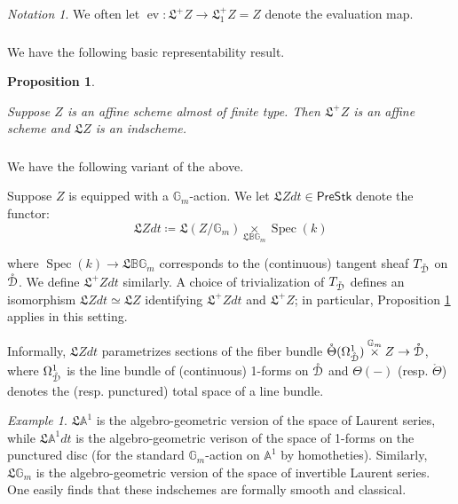\documentclass[reqno,11pt]{amsart}
\numberwithin{equation}{subsection}
\newtheorem{prop}[thm]{Proposition}
\theoremstyle{remark}
\newtheorem{example}[thm]{Example}
\newtheorem{notation}[thm]{Notation}
\newcommand{\bA}{{\mathbb A}}
\newcommand{\bB}{{\mathbb B}}
\newcommand{\bG}{{\mathbb G}}
\newcommand{\sD}{{\EuScript D}}
\newcommand{\fL}{{\mathfrak L}}
\newcommand{\on}{\operatorname}
\newcommand{\Spec}{\on{Spec}}
\newcommand{\ev}{\on{ev}}
\newcommand{\PreStk}{\mathsf{PreStk}}
\renewcommand{\o}[1]{\mathring{#1}}
\begin{document}
\begin{notation}

We often let $\ev:\fL^+ Z \to \fL_1^+ Z = Z$ 
denote the evaluation map.

\end{notation}

\subsubsection{}

We have the following basic representability result.

\begin{prop}\label{p:loop-rep}

Suppose $Z$ is an affine scheme almost of finite type.
Then $\fL^+ Z$ is an affine scheme and $\fL Z$ is an 
indscheme.

\end{prop}

\subsubsection{}

We have the following variant of the above.

Suppose $Z$ is equipped with a $\bG_m$-action. 
We let $\fL Zdt \in \PreStk$ denote the functor:
%
\[
\fL Z dt \coloneqq \fL(Z/\bG_m) \underset{\fL \bB \bG_m}{\times} \Spec(k)
\]

\noindent where $\Spec(k) \to \fL \bB \bG_m$ corresponds to the
(continuous) tangent sheaf $T_{\o{\sD}}$ on $\o{\sD}$.
We define $\fL^+Z dt$ similarly. A choice of trivialization
of $T_{\o{\sD}}$ defines an isomorphism $\fL Z dt \simeq \fL Z$
identifying $\fL^+ Z dt$ and $\fL^+ Z$; in particular,
Proposition \ref{p:loop-rep} applies in this setting.

Informally, $\fL Z dt$ parametrizes sections of
the fiber bundle $\o{\Theta}(\Omega_{\o{\sD}}^1) \overset{\bG_m}{\times} Z \to 
\o{\sD}$, where $\Omega_{\o{\sD}}^1$ is the line bundle 
of (continuous) 1-forms on $\o{\sD}$ and $\Theta(-)$ 
(resp. $\o{\Theta}$) denotes the
(resp. punctured) total space of a line bundle. 

\begin{example}

$\fL \bA^1$ is the algebro-geometric version of the space of Laurent
series, while $\fL \bA^1 dt$ is the algebro-geometric verison of the
space of 1-forms on the punctured disc (for the standard $\bG_m$-action 
on $\bA^1$ by homotheties). Similarly, $\fL \bG_m$ is the algebro-geometric
version of the space of invertible Laurent series.
One easily finds that these indschemes are formally smooth and classical.

\end{example}
\end{document}
